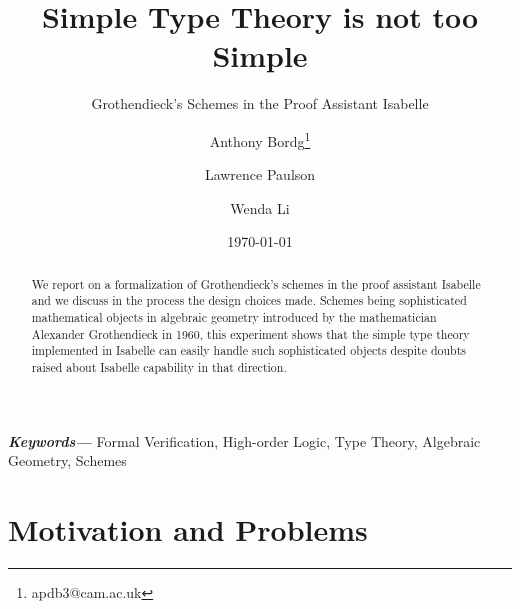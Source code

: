 \documentclass[12pt]{scrartcl}
\providecommand{\keywords}[1]{\textbf{\textit{Keywords---}} #1}
\begin{document}
\title{Simple Type Theory is not too Simple}
\subtitle{Grothendieck's Schemes in the Proof Assistant Isabelle}
\author{Anthony Bordg\thanks{apdb3@cam.ac.uk} \and Lawrence Paulson \and Wenda Li}
\date\today 
\maketitle

\begin{abstract}
 	We report on a formalization of Grothendieck's schemes in the proof assistant Isabelle and we discuss in the process the design choices made. Schemes being sophisticated mathematical objects in algebraic geometry introduced by the mathematician Alexander Grothendieck in 1960, this experiment shows that the simple type theory implemented in Isabelle can easily handle such sophisticated objects despite doubts raised about Isabelle capability in that direction.   
\end{abstract}

\keywords{Formal Verification, High-order Logic, Type Theory, Algebraic Geometry, Schemes}

\section{Motivation and Problems}
\label{sec:intro}
\end{document}
